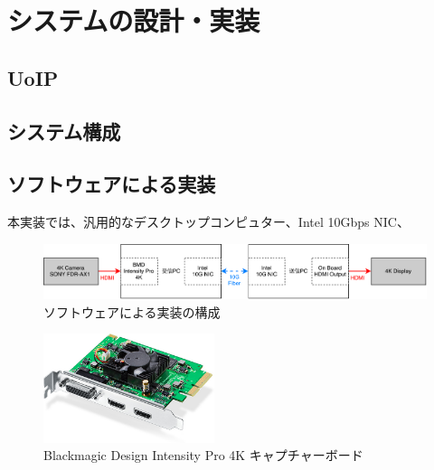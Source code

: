 \chapter{システムの設計・実装}
\label{chap:implementation}


\section{UoIP} %

\section{システム構成}



\section{ソフトウェアによる実装}

本実装では、汎用的なデスクトップコンピュター、Intel 10Gbps NIC、

\begin{figure}[htbp]
    \begin{center}
        \includegraphics[bb=0 0 841 121,width=15.5cm]{img/software-implement-flow.pdf}
    \end{center}
    \caption{ソフトウェアによる実装の構成}
    \label{fig:software-implement-flow}
\end{figure}

\begin{figure}[htbp]
    \begin{center}
        \includegraphics[bb=0 0 644 410,width=5cm]{img/bmd-intensity-pro-4k.jpg}
    \end{center}
    \caption{Blackmagic Design Intensity Pro 4K キャプチャーボード}
    \label{fig:ted-4k-fmc-card}
\end{figure}

